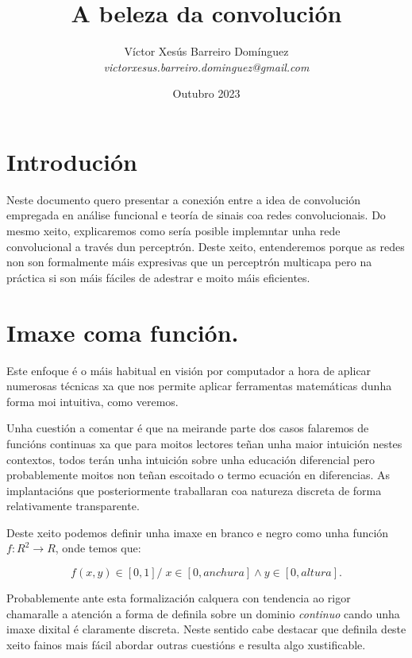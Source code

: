 \documentclass{article}
\title{A beleza da convolución}
\author{Víctor Xesús Barreiro Domínguez \\
\textit{victorxesus.barreiro.dominguez@gmail.com}}
\date{Outubro 2023}
\begin{document}
\maketitle

\tableofcontents

\section{Introdución}

Neste documento quero presentar a conexión entre a idea de convolución empregada en análise funcional e teoría de sinais coa redes convolucionais. Do mesmo xeito, explicaremos como sería posible implemntar unha rede convolucional a través dun perceptrón. Deste xeito, entenderemos porque as redes non son formalmente máis expresivas que un perceptrón multicapa pero na práctica si son máis fáciles de adestrar e moito máis eficientes. 

\section{Imaxe coma función.}

Este enfoque é o máis habitual en visión por computador a hora de aplicar numerosas técnicas xa que nos permite aplicar ferramentas matemáticas dunha forma moi intuitiva, como veremos. 

Unha cuestión a comentar é que na meirande parte dos casos falaremos de funcións continuas xa que para moitos lectores teñan unha maior intuición nestes contextos, todos terán unha intuición sobre unha educación diferencial pero probablemente moitos non teñan escoitado o termo ecuación en diferencias. As implantacións que posteriormente traballaran coa natureza discreta de forma relativamente transparente. 

Deste xeito podemos definir unha imaxe en branco e negro como unha función $f: R^{2} \longrightarrow R$, onde temos que:

\begin{equation}
    f(x, y) \in [0,1] / \; x \in [0,anchura] \wedge y \in [0,altura].
\end{equation}

Probablemente ante esta formalización calquera con tendencia ao rigor chamaralle a atención a forma de definila sobre un dominio \textit{continuo} cando unha imaxe dixital é claramente discreta. Neste sentido cabe destacar que definila deste xeito fainos mais fácil abordar outras cuestións e resulta algo xustificable.
\end{document}
